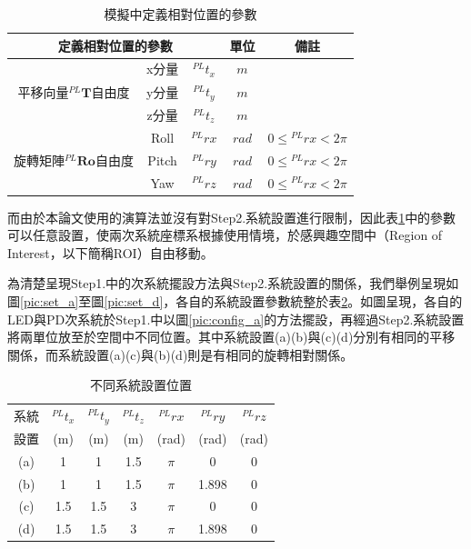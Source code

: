 \begin{table}[htpb]
    \renewcommand{\arraystretch}{1.3}
    \setlength{\arrayrulewidth}{0.15mm}
    \setlength{\doublerulesep}{0.12mm}
    \caption{模擬中定義相對位置的參數}
    \label{tab:para_relative}
    \centering
    \begin{tabular}{|c|cc|c|c|}
    \hline
    \multicolumn{3}{|c|}{\textbf{定義相對位置的參數}}  &\textbf{單位}  &  \textbf{備註}   \\
    \hline
    \multirow{3}{*}{平移向量$^{PL}\boldsymbol{T}$自由度} 
    & x分量 &$^{PL}t_x$ & $m$ &  \\
    & y分量 &$^{PL}t_y$ & $m$ &  \\
    & z分量 &$^{PL}t_z$ & $m$ &  \\
    \hline
    \multirow{3}{*}{旋轉矩陣$^{PL}\boldsymbol{Ro}$自由度} 
    & Roll &${^{PL}rx}$ & $rad$ &  $0\leq {^{PL}rx}<2\pi$\\
    & Pitch &$^{PL}ry$ & $rad$ & $0\leq {^{PL}rx}<2\pi$ \\
    & Yaw &$^{PL}rz$ & $rad$ & $0\leq {^{PL}rx}<2\pi$ \\
    \hline
    \end{tabular}
    \end{table}

    而由於本論文使用的演算法並沒有對Step2.系統設置進行限制，因此表\ref{tab:para_relative}中的參數可以任意設置，使兩次系統座標系根據使用情境，於感興趣空間中（Region of Interest，以下簡稱ROI）自由移動。

    為清楚呈現Step1.中的次系統擺設方法與Step2.系統設置的關係，我們舉例呈現如圖\ref{pic:set_a}至圖\ref{pic:set_d}，各自的系統設置參數統整於表\ref{tab:data_set_system}。如圖呈現，各自的LED與PD次系統於Step1.中以圖\ref{pic:config_a}的方法擺設，再經過Step2.系統設置將兩單位放至於空間中不同位置。其中系統設置(a)(b)與(c)(d)分別有相同的平移關係，而系統設置(a)(c)與(b)(d)則是有相同的旋轉相對關係。

    \begin{table}[htpb]
        \begin{center}
          \caption{不同系統設置位置}
          \label{tab:data_set_system}
          \begin{tabular}{c||c|c|c|c|c|c} %
             系統& $^{PL}t_x$ & $^{PL}t_y$&$^{PL}t_z$&$ ^{PL}rx$ & $^{PL}ry$&$^{PL}rz$\\
             設置& (m) & (m)&(m)&(rad) & (rad)&(rad)\\
            \hline
            (a)& 1 & 1&1.5&$\pi$ & 0&0\\
            (b)& 1 & 1&1.5&$\pi$ & 1.898&0\\
            (c)& 1.5 & 1.5&3&$\pi$ & 0&0\\
            (d)& 1.5 & 1.5&3&$\pi$ & 1.898&0\\
          \end{tabular}
        \end{center}
      \end{table}


